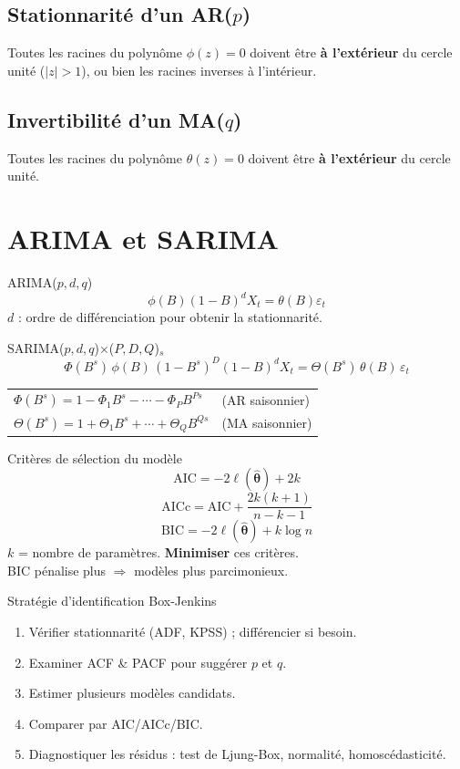 \documentclass[10pt,a4paper,twocolumn]{article}
\begin{document}
\subsection{Stationnarité d'un AR($p$)}
Toutes les racines du polynôme $\phi(z) = 0$ doivent être \textbf{à l'extérieur} du cercle unité ($|z| > 1$), ou bien les racines inverses à l'intérieur.

\subsection{Invertibilité d'un MA($q$)}
Toutes les racines du polynôme $\theta(z) = 0$ doivent être \textbf{à l'extérieur} du cercle unité.

\section{ARIMA et SARIMA}

\begin{formulebox}{ARIMA($p,d,q$)}
\[
\phi(B)(1-B)^d X_t = \theta(B)\varepsilon_t
\]
$d$ : ordre de différenciation pour obtenir la stationnarité.
\end{formulebox}

\begin{formulebox}{SARIMA($p,d,q$)$\times$($P,D,Q$)$_s$}
\[
\Phi(B^s)\,\phi(B)\,(1-B^s)^D(1-B)^d X_t = \Theta(B^s)\,\theta(B)\,\varepsilon_t
\]
\begin{tabular}{@{}ll@{}}
$\Phi(B^s) = 1 - \Phi_1 B^s - \cdots - \Phi_P B^{Ps}$ & (AR saisonnier)\\
$\Theta(B^s) = 1 + \Theta_1 B^s + \cdots + \Theta_Q B^{Qs}$ & (MA saisonnier)
\end{tabular}
\end{formulebox}

\begin{defbox}{Critères de sélection du modèle}
\[
\text{AIC} = -2\ell(\hat{\bm{\theta}}) + 2k
\]
\[
\text{AICc} = \text{AIC} + \frac{2k(k+1)}{n-k-1}
\]
\[
\text{BIC} = -2\ell(\hat{\bm{\theta}}) + k\log n
\]
$k$ = nombre de paramètres. \textbf{Minimiser} ces critères.\\
BIC pénalise plus $\Rightarrow$ modèles plus parcimonieux.
\end{defbox}

\begin{defbox}{Stratégie d'identification Box-Jenkins}
\begin{enumerate}[leftmargin=*,itemsep=1pt]
  \item Vérifier stationnarité (ADF, KPSS) ; différencier si besoin.
  \item Examiner ACF \& PACF pour suggérer $p$ et $q$.
  \item Estimer plusieurs modèles candidats.
  \item Comparer par AIC/AICc/BIC.
  \item Diagnostiquer les résidus : test de Ljung-Box, normalité, homoscédasticité.
\end{enumerate}
\end{defbox}
\end{document}
